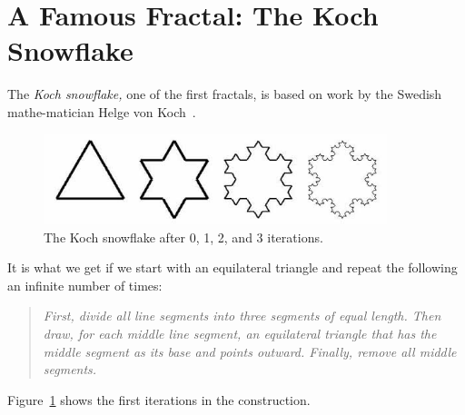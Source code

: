 \documentclass[12pt,a4paper]{article}
\begin{document}
\section{A Famous Fractal: The Koch Snowflake}
The \emph{Koch snowflake,} one of the first fractals, 
is based on work by the Swedish mathe-matician
Helge von Koch~\cite{koch}.  
\begin{figure}[h] \label{koch}
    \centering
    \includegraphics[width=10cm]{snowflake.jpg}
    \caption{The Koch snowflake after 0, 1, 2, and 3 iterations. }
\end{figure}
It is what we get if we start with an equilateral triangle
and repeat the following an infinite number of times:
\begin{quote}
    \textit{First, divide all line segments into three segments of equal length. Then draw,
    for each middle line segment, an equilateral triangle that has the middle segment as its base and points outward. Finally, remove all middle segments.}
\end{quote}
Figure~\ref{koch} shows the first iterations in the construction.
\end{document}
